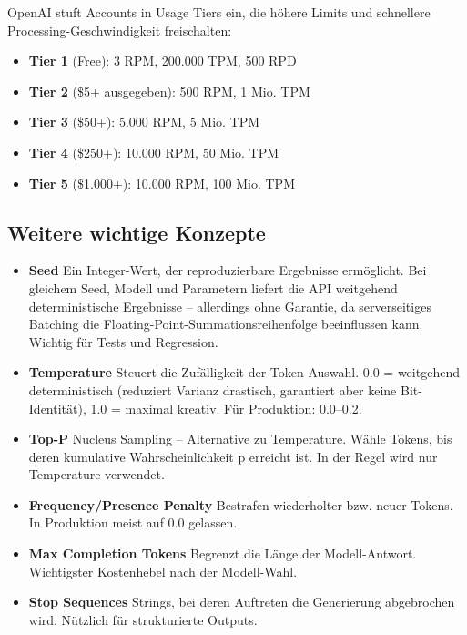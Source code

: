 OpenAI stuft Accounts in Usage Tiers ein, die höhere Limits und schnellere Processing-Geschwindigkeit freischalten:

\begin{itemize}[leftmargin=*]
    \item \textbf{Tier 1} (Free): 3 RPM, 200.000 TPM, 500 RPD
    \item \textbf{Tier 2} (\$5+ ausgegeben): 500 RPM, 1 Mio. TPM
    \item \textbf{Tier 3} (\$50+): 5.000 RPM, 5 Mio. TPM
    \item \textbf{Tier 4} (\$250+): 10.000 RPM, 50 Mio. TPM
    \item \textbf{Tier 5} (\$1.000+): 10.000 RPM, 100 Mio. TPM
\end{itemize}

\subsection{Weitere wichtige Konzepte}

\begin{itemize}

    \item \textbf{Seed} Ein Integer-Wert, der reproduzierbare Ergebnisse ermöglicht. Bei gleichem Seed, Modell und Parametern liefert die API weitgehend deterministische Ergebnisse -- allerdings ohne Garantie, da serverseitiges Batching die Floating-Point-Summationsreihenfolge beeinflussen kann. Wichtig für Tests und Regression.
    \item \textbf{Temperature} Steuert die Zufälligkeit der Token-Auswahl. 0.0 = weitgehend deterministisch (reduziert Varianz drastisch, garantiert aber keine Bit-Identität), 1.0 = maximal kreativ. Für Produktion: 0.0--0.2.
    \item \textbf{Top-P} Nucleus Sampling -- Alternative zu Temperature. Wähle Tokens, bis deren kumulative Wahrscheinlichkeit p erreicht ist. In der Regel wird nur Temperature verwendet.
    \item \textbf{Frequency/Presence Penalty} Bestrafen wiederholter bzw. neuer Tokens. In Produktion meist auf 0.0 gelassen.
    \item \textbf{Max Completion Tokens} Begrenzt die Länge der Modell-Antwort. Wichtigster Kostenhebel nach der Modell-Wahl.
    \item \textbf{Stop Sequences} Strings, bei deren Auftreten die Generierung abgebrochen wird. Nützlich für strukturierte Outputs.
\end{itemize}

